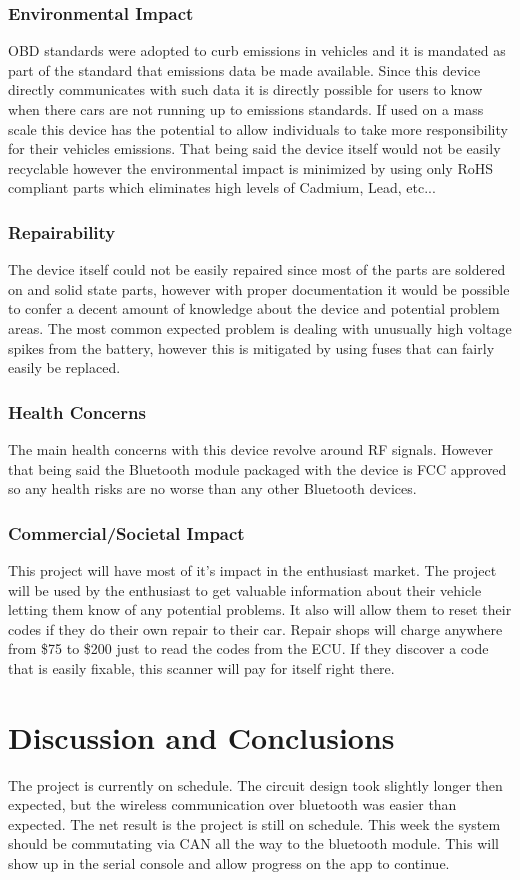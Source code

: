 \documentclass[12pt,letterpaper]{article}
\begin{document}
\subsubsection{Environmental Impact}
OBD standards were adopted to curb emissions in vehicles and it is mandated as part of the standard that emissions data be made available. Since this device directly communicates with such data it is directly possible for users to know when there cars are not running up to emissions standards. If used on a mass scale this device has the potential to allow individuals to take more responsibility for their vehicles emissions. That being said the device itself would not be easily recyclable however the environmental impact is minimized by using only RoHS compliant parts which eliminates high levels of Cadmium, Lead, etc...

\subsubsection{Repairability}
The device itself could not be easily repaired since most of the parts are soldered on and solid state parts, however with proper documentation it would be possible to confer a decent amount of knowledge about the device and potential problem areas. The most common expected problem is dealing with unusually high voltage spikes from the battery, however this is mitigated by using fuses that can fairly easily be replaced.

\subsubsection{Health Concerns}
The main health concerns with this device revolve around RF signals. However that being said the Bluetooth module packaged with the device is FCC approved so any health risks are no worse than any other Bluetooth devices.

\subsubsection{Commercial/Societal Impact}
This project will have most of it's impact in the enthusiast market. The project will be used by the enthusiast to get valuable information about their vehicle letting them know of any potential problems. It also will allow them to reset their codes if they do their own repair to their car. Repair shops will charge anywhere from \$75 to \$200 just to read the codes from the ECU. If they discover a code that is easily fixable, this scanner will pay for itself right there.

\section{Discussion and Conclusions}
The project is currently on schedule. The circuit design took slightly longer then expected, but the wireless communication over bluetooth was easier than expected. The net result is the project is still on schedule. This week the system should be commutating via CAN all the way to the bluetooth module. This will show up in the serial console and allow progress on the app to continue. 
\end{document}
